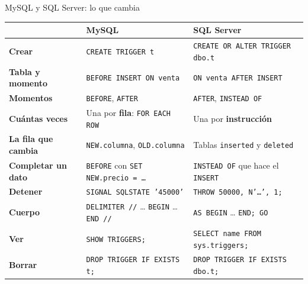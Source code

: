 \documentclass[aspectratio=169,10pt,c]{beamer}
\begin{document}
\begin{frame}{MySQL y SQL Server: lo que cambia}
\vspace{-0.15cm}
\begin{center}
\footnotesize
\renewcommand{\arraystretch}{1.3}
\begin{tabular}{@{}>{\bfseries}p{3.1cm}>{\raggedright}p{4.9cm}>{\raggedright\arraybackslash}p{5.2cm}@{}}
\toprule
 & MySQL & SQL Server \\
\midrule
Crear & \texttt{CREATE TRIGGER t} & \texttt{CREATE OR ALTER TRIGGER dbo.t} \\
Tabla y momento & \texttt{BEFORE INSERT ON venta} & \texttt{ON venta AFTER INSERT} \\
Momentos & \texttt{BEFORE}, \texttt{AFTER} & \texttt{AFTER}, \texttt{INSTEAD OF} \\
Cuántas veces & Una por \textbf{fila}: \texttt{FOR EACH ROW} & Una por \textbf{instrucción} \\
La fila que cambia & \texttt{NEW.columna}, \texttt{OLD.columna} & Tablas \texttt{inserted} y \texttt{deleted} \\
Completar un dato & \texttt{BEFORE} con \texttt{SET NEW.precio = \ldots} & \texttt{INSTEAD OF} que hace el \texttt{INSERT} \\
Detener & \texttt{SIGNAL SQLSTATE '45000'} & \texttt{THROW 50000, N'\ldots', 1;} \\
Cuerpo & \texttt{DELIMITER //} \ldots{} \texttt{BEGIN} \ldots{} \texttt{END //} & \texttt{AS BEGIN} \ldots{} \texttt{END; GO} \\
Ver & \texttt{SHOW TRIGGERS;} & \texttt{SELECT name FROM sys.triggers;} \\
Borrar & \texttt{DROP TRIGGER IF EXISTS t;} & \texttt{DROP TRIGGER IF EXISTS dbo.t;} \\
\bottomrule
\end{tabular}
\end{center}
\end{frame}
\end{document}
